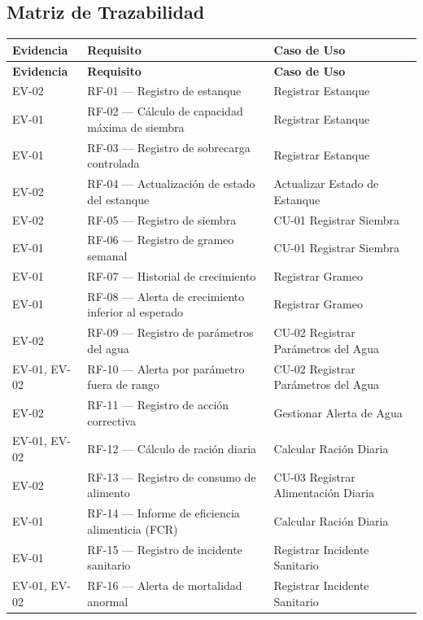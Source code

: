 \documentclass[11pt,a4paper]{article}
\begin{document}
\subsection{Matriz de Trazabilidad}

\begin{longtable}{|p{2.5cm}|p{6.5cm}|p{5.5cm}|}

\hline
\textbf{Evidencia} & \textbf{Requisito} & \textbf{Caso de Uso} \\
\hline
\endfirsthead
\hline
\textbf{Evidencia} & \textbf{Requisito} & \textbf{Caso de Uso} \\
\hline
\endhead
\hline
\endfoot
\hline
\endlastfoot
EV-02 & RF-01 — Registro de estanque & Registrar Estanque \\
\hline
EV-01 & RF-02 — Cálculo de capacidad máxima de siembra & Registrar Estanque \\
\hline
EV-01 & RF-03 — Registro de sobrecarga controlada & Registrar Estanque \\
\hline
EV-02 & RF-04 — Actualización de estado del estanque & Actualizar Estado de Estanque \\
\hline
EV-02 & RF-05 — Registro de siembra & CU-01 Registrar Siembra \\
\hline
EV-01 & RF-06 — Registro de grameo semanal & CU-01 Registrar Siembra \\
\hline
EV-01 & RF-07 — Historial de crecimiento & Registrar Grameo \\
\hline
EV-01 & RF-08 — Alerta de crecimiento inferior al esperado & Registrar Grameo \\
\hline
EV-02 & RF-09 — Registro de parámetros del agua & CU-02 Registrar Parámetros del Agua \\
\hline
EV-01, EV-02 & RF-10 — Alerta por parámetro fuera de rango & CU-02 Registrar Parámetros del Agua \\
\hline
EV-02 & RF-11 — Registro de acción correctiva & Gestionar Alerta de Agua \\
\hline
EV-01, EV-02 & RF-12 — Cálculo de ración diaria & Calcular Ración Diaria \\
\hline
EV-02 & RF-13 — Registro de consumo de alimento & CU-03 Registrar Alimentación Diaria \\
\hline
EV-01 & RF-14 — Informe de eficiencia alimenticia (FCR) & Calcular Ración Diaria \\
\hline
EV-01 & RF-15 — Registro de incidente sanitario & Registrar Incidente Sanitario \\
\hline
EV-01, EV-02 & RF-16 — Alerta de mortalidad anormal & Registrar Incidente Sanitario \\

\end{longtable}
\end{document}

